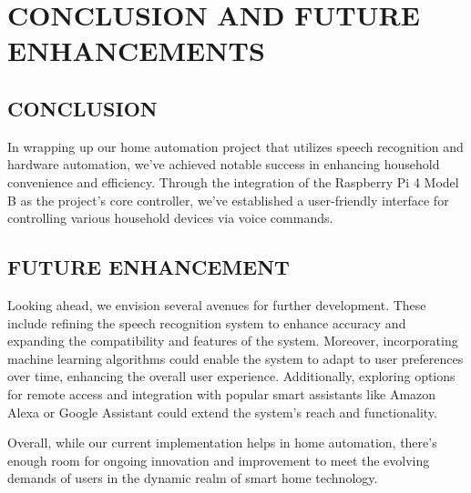 \chapter{CONCLUSION AND FUTURE ENHANCEMENTS}
\section{CONCLUSION}
In wrapping up our home automation project that utilizes speech recognition and hardware automation, we've achieved notable success in enhancing household convenience and efficiency. Through the integration of the Raspberry Pi 4 Model B as the project's core controller, we've established a user-friendly interface for controlling various household devices via voice commands. 

\section{FUTURE ENHANCEMENT}

Looking ahead, we envision several avenues for further development. These include refining the speech recognition system to enhance accuracy and expanding the compatibility and features of the system. Moreover, incorporating machine learning algorithms could enable the system to adapt to user preferences over time, enhancing the overall user experience. Additionally, exploring options for remote access and integration with popular smart assistants like Amazon Alexa or Google Assistant could extend the system's reach and functionality. 

Overall, while our current implementation helps in home automation, there's enough room for ongoing innovation and improvement to meet the evolving demands of users in the dynamic realm of smart home technology.
